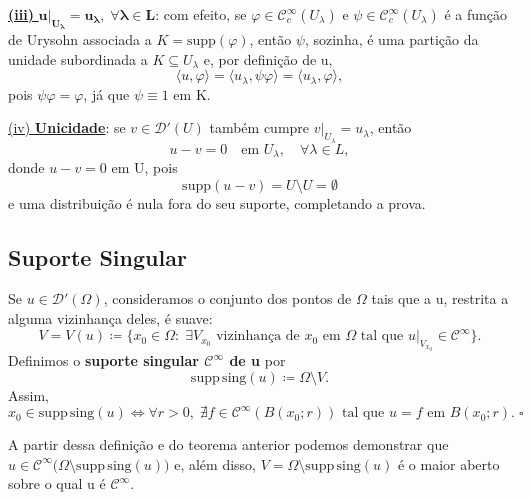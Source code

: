 \documentclass[../distribution_theory_notes.tex]{subfiles}
\begin{document}
\begin{proof*}
	\underline{\textbf{(iii)} \(\mathbf{u|_{U_{\lambda }}=u_{\lambda },\;\forall \lambda \in L}\)}: com efeito, se \(\varphi \in \mathcal{C}_{c}^{\infty}(U_{\lambda })\) e \(\psi \in \mathcal{C}_{c}^{\infty}(U_{\lambda })\) é a função de Urysohn associada a \(K=\mathrm{supp}(\varphi )\), então \(\psi \), sozinha, é uma partição da unidade subordinada a \(K\subseteq U_{\lambda }\) e, por definição de u,
	\[
		\langle u,\varphi \rangle=\langle u_{\lambda },\psi \varphi \rangle=\langle u_{\lambda },\varphi \rangle,
	\]
	pois \(\psi \varphi =\varphi \), já que \(\psi \equiv 1\) em K.

	\underline{(iv) \textbf{Unicidade}}: se \(v\in \mathcal{D}'(U)\) também cumpre \(v|_{U_{\lambda }}=u_{\lambda }\), então
	\[
		u-v=0\quad \text{em }U_{\lambda },\quad \forall \lambda \in L,
	\]
	donde \(u-v=0\) em U, pois
	\[
		\mathrm{supp}(u-v)=U\setminus U=\emptyset
	\]
	e uma distribuição é nula fora do seu suporte, completando a prova. \qedsymbol
\end{proof*}

\subsection{Suporte Singular}
\begin{def*}
	Se \(u\in \mathcal{D}'(\Omega )\), consideramos o conjunto dos pontos de \(\Omega \) tais que a u, restrita a alguma vizinhança deles, é suave:
	\[
		V=V(u)\coloneqq \bigl\{x_{0}\in \Omega :\; \exists V_{x_{0}}\text{ vizinhança de }x_{0}\text{ em }\Omega \text{ tal que }u|_{V_{x_{0}}}\in \mathcal{C}^{\infty}\bigr\}.
	\]
	Definimos o \textbf{suporte singular \(\mathbf{\mathcal{C}^{\infty}}\) de u} por
	\[
		\mathrm{supp\,sing}(u)\coloneqq \Omega \setminus V.
	\]
	Assim,
	\[
		x_{0}\in \mathrm{supp\,sing}(u)
		\Longleftrightarrow
		\forall r>0,\; \nexists f\in \mathcal{C}^{\infty}(B(x_{0};r))\text{ tal que }u=f\text{ em }B(x_{0};r). \;\square
	\]
\end{def*}

\begin{tcolorbox}[
		skin=enhanced,
		title=Observação,
		fonttitle=\bfseries,
		colframe=black,
		colbacktitle=cyan!75!white,
		colback=cyan!15,
		colbacklower=black,
		coltitle=black,
		drop fuzzy shadow,
	]
	A partir dessa definição e do teorema anterior podemos demonstrar que\(u\in \mathcal{C}^{\infty}\bigl(\Omega \setminus \mathrm{supp\,sing}(u)\bigr)\)
	e, além disso, \(V=\Omega \setminus \mathrm{supp\,sing}(u)\) é o maior aberto sobre o qual u é \(\mathcal{C}^{\infty}\).
\end{tcolorbox}
\end{document}
